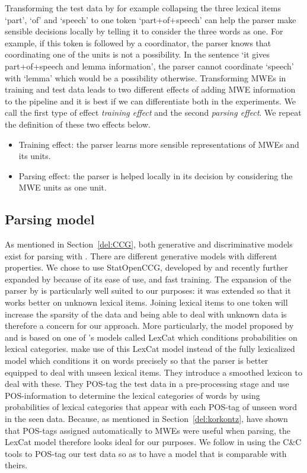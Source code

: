 \documentclass[output=paper]{langsci/langscibook}
\begin{document}
\indent Transforming the test data by for example collapsing the three lexical items `part', `of' and `speech' to one token `part+of+speech' can help the parser make sensible decisions locally by telling it to consider the three words as one. For example, if this token is followed by a coordinator, the parser knows that coordinating one of the units is not a possibility. In the sentence `it gives part+of+speech and lemma information', the parser cannot coordinate `speech' with `lemma' which would be a possibility otherwise. Transforming MWEs in training and test data leads to two different effects of adding MWE information to the  pipeline and it is best if we can differentiate both in the experiments. We call the first type of effect \textit{training effect} and the second \textit{parsing effect}. We repeat the definition of these two effects below.
    \begin{itemize}
        \item Training effect: the parser learns more sensible representations of MWEs and its units. 
        \item Parsing effect: the parser is helped locally in its decision by considering the MWE units as one unit.
    \end{itemize}

\subsection{Parsing model}
\label{del:parsingmodel}
\indent As mentioned in Section~\ref{del:CCG}, both generative and discriminative models exist for parsing with . There are different generative models with different properties. We chose to use StatOpenCCG, developed by \citet{christodoulopoulos2008} and recently further expanded by \citet{deoskar} because of its ease of use,  and fast training. The expansion of the parser by \citet{deoskar} is particularly well suited to our purposes: it was extended so that it works better on unknown lexical items. Joining lexical items to one token will increase the sparsity of the data and being able to deal with unknown data is therefore a concern for our approach. More particularly, the model proposed by \citet{christodoulopoulos2008} and \citet{deoskar} is based on one of \citet{hockenmaier2003}'s models called LexCat which conditions probabilities on lexical categories. \citet{deoskar} make use of this LexCat model instead of the fully lexicalized model which conditions it on words precisely so that the parser is better equipped to deal with unseen lexical items. They introduce a smoothed lexicon to deal with these. They POS-tag the test data in a pre-processing stage and use POS-information to determine the lexical categories of words by using probabilities of lexical categories that appear with each POS-tag of unseen word in the seen data. Because, as mentioned in Section~\ref{del:korkontz}, \citet{korkontzelosetal2010} have shown that POS-tags assigned automatically to MWEs were useful when parsing, the LexCat model therefore looks ideal for our purposes. We follow \citet{deoskar} in using the C\&C tools \citep{cctools} to POS-tag our test data so as to have a model that is comparable with theirs.
\end{document}
